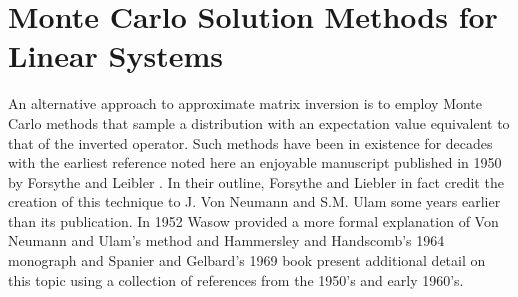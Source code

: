 \chapter{Monte Carlo Solution Methods for Linear Systems}
\label{ch:stochastic_methods}
An alternative approach to approximate matrix inversion is to employ
Monte Carlo methods that sample a distribution with an expectation
value equivalent to that of the inverted operator. Such methods have
been in existence for decades with the earliest reference noted here
an enjoyable manuscript published in 1950 by Forsythe and Leibler
\citep{forsythe_matrix_1950}. In their outline, Forsythe and Liebler
in fact credit the creation of this technique to J. Von Neumann and
S.M. Ulam some years earlier than its publication. In 1952 Wasow
provided a more formal explanation of Von Neumann and Ulam's method
\citep{wasow_note_1952} and Hammersley and Handscomb's 1964 monograph
\citep{hammersley_monte_1964} and Spanier and Gelbard's 1969 book
\citep{spanier_monte_1969} present additional detail on this topic
using a collection of references from the 1950's and early 1960's.

